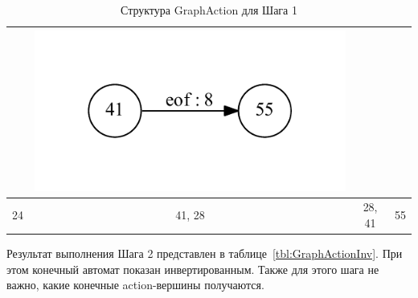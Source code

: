 \begin{table}[h]
\begin{tabular}{ | c | c | c | c | }
\begin{minipage}{.22\textwidth}
    \end{minipage}
    & 
    \begin{minipage}{.22\textwidth}
      \includegraphics[width=\linewidth]{Polubelova/41_tok}
    \end{minipage}    
    \\ \hline
    24 & 41, 28 & 28, 41 & 55
    \\ \hline
  \end{tabular}
  \caption{Структура GraphAction для Шага 1}
  \label{tbl:GraphAction}
\end{table}

Результат выполнения Шага 2 представлен в таблице~\ref{tbl:GraphActionInv}. При этом конечный автомат показан инвертированным. Также для этого шага не важно, какие конечные action-вершины получаются.

